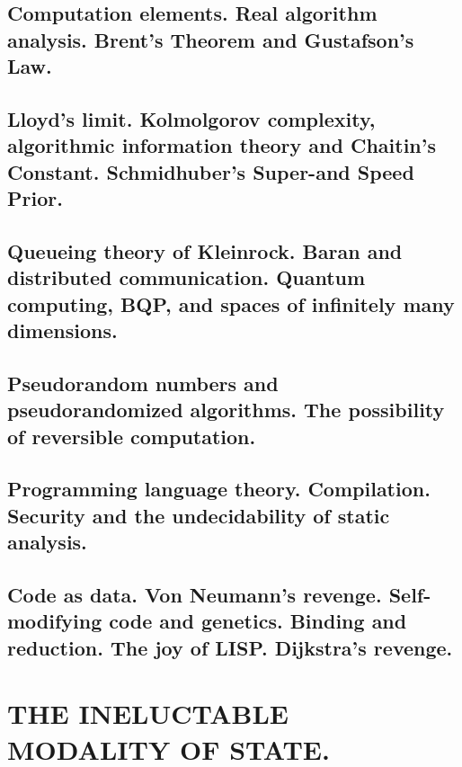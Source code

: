 \documentclass[letterpaper,draft]{memoir}
\begin{document}
\chapter{Computation elements. Real algorithm analysis. Brent's Theorem and
Gustafson's Law.}

\chapter{Lloyd's limit. Kolmolgorov complexity, algorithmic information theory and
Chaitin's Constant. Schmidhuber's Super- \latintext and Speed Prior.}

\chapter{Queueing theory of Kleinrock. Baran and distributed communication. Quantum
computing, BQP, and spaces of infinitely many dimensions.}

\chapter{Pseudorandom numbers and pseudorandomized algorithms. The possibility of
reversible computation.}

\chapter{Programming language theory. Compilation. Security and the undecidability of
static analysis.}

\chapter{Code as data. Von Neumann's revenge. Self-modifying code and genetics.
Binding and reduction. The joy of LISP. Dijkstra's revenge.}

\part{THE INELUCTABLE MODALITY OF STATE.}

\end{document}
